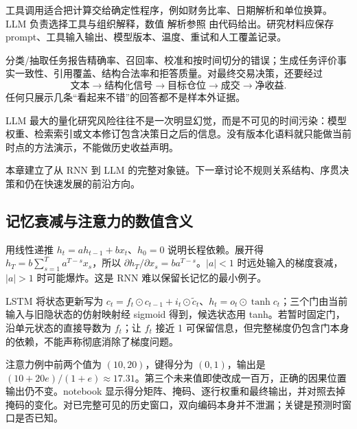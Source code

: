 

工具调用适合把计算交给确定性程序，例如财务比率、日期解析和单位换算。LLM 负责选择工具与组织解释，数值 解析参照 由代码给出。研究材料应保存 prompt、工具输入输出、模型版本、温度、重试和人工覆盖记录。


分类/抽取任务报告精确率、召回率、校准和按时间切分的错误；生成任务评价事实一致性、引用覆盖、结构合法率和拒答质量。对最终交易决策，还要经过
\[
\text{文本}\to\text{结构化信号}\to\text{目标仓位}
\to\text{成交}\to\text{净收益}.
\]
任何只展示几条“看起来不错”的回答都不是样本外证据。

\begin{diagnostic}
LLM 最大的量化研究风险往往不是一次明显幻觉，而是不可见的时间污染：模型权重、检索索引或文本修订包含决策日之后的信息。没有版本化语料就只能做当前时点的方法演示，不能做历史收益声明。
\end{diagnostic}

本章建立了从 RNN 到 LLM 的完整对象链。下一章讨论不规则关系结构、序贯决策和仍在快速发展的前沿方向。

\subsection{记忆衰减与注意力的数值含义}
用线性递推 $h_t=ah_{t-1}+bx_t$、$h_0=0$ 说明长程依赖。展开得 $h_T=b\sum_{s=1}^Ta^{T-s}x_s$，所以 $\partial h_T/\partial x_s=ba^{T-s}$。$|a|<1$ 时远处输入的梯度衰减，$|a|>1$ 时可能爆炸。这是 RNN 难以保留长记忆的最小例子。

LSTM 将状态更新写为 $c_t=f_t\odot c_{t-1}+i_t\odot\tilde c_t$、$h_t=o_t\odot\tanh c_t$；三个门由当前输入与旧隐状态的仿射映射经 sigmoid 得到，候选状态用 tanh。若暂时固定门，沿单元状态的直接导数为 $f_t$；让 $f_t$ 接近 1 可保留信息，但完整梯度仍包含门本身的依赖，不能声称彻底消除了梯度问题。

注意力例中前两个值为 $(10,20)$，键得分为 $(0,1)$，输出是 $(10+20e)/(1+e)\approx17.31$。第三个未来值即使改成一百万，正确的因果位置输出仍不变。notebook 显示得分矩阵、掩码、逐行权重和最终输出，并对照去掉掩码的变化。对已完整可见的历史窗口，双向编码本身并不泄漏；关键是预测时窗口是否已知。
